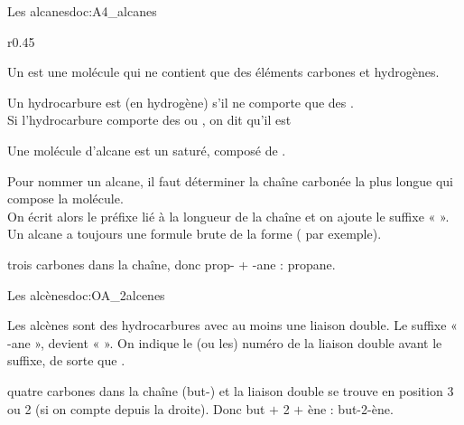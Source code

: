 
\begin{doc}{Les alcanes}{doc:A4_alcanes}
  \begin{wrapfigure}{r}{0.45\linewidth}   
    \vspace*{-30pt}
    \begin{boite}
      \begin{encart}
        Un  est une molécule qui ne contient que des éléments carbones et hydrogènes.
      \end{encart}
      \begin{encart}
        Un hydrocarbure est  (en hydrogène) s'il ne comporte que des . \\
        Si l'hydrocarbure comporte des  ou , on dit qu'il est 
      \end{encart}
    \end{boite}
  \end{wrapfigure}
  \phantom{b}\vspace*{-14pt}
  
  \begin{encart}
    Une molécule d'alcane est un  saturé, composé de .
  \end{encart}
  Pour nommer un alcane, il faut déterminer la chaîne carbonée la plus longue qui compose la molécule. \\
  On écrit alors le préfixe lié à la longueur de la chaîne et on ajoute le suffixe «  ». \\
  Un alcane a toujours une formule brute de la forme  ( par exemple).
  
  \vspace*{4pt}
  \exemple {} trois carbones dans la chaîne, donc prop- + -ane : propane.
\end{doc}



\begin{doc}{Les alcènes}{doc:OA_2alcenes}
  \begin{encart}
    Les alcènes sont des hydrocarbures avec au moins une liaison double.
    Le suffixe « -ane », devient «  ».
    On indique le (ou les) numéro de la liaison double avant le suffixe, de sorte que .
  \end{encart}
  \exemple {} quatre carbones dans la chaîne (but-) et la liaison double se trouve en position 3 ou 2 (si on compte depuis la droite).
  Donc but $+$ 2 $+$ ène : but-2-ène.
\end{doc}

